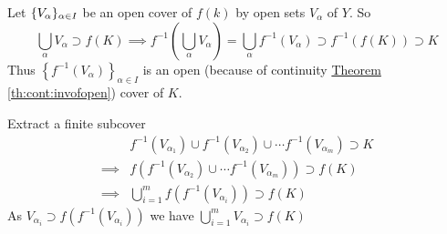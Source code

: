 \begin{myproof}
	Let $\{V_{\alpha}\}_{\alpha\in I}$ be an open cover of $f(k)$ by open sets $V_{\alpha}$ of $Y$. So $$\bigcup\limits_{\alpha}V_{\alpha} \supset f(K)\implies f^{-1}\left(\bigcup\limits_{\alpha}V_{\alpha}\right)=\bigcup\limits_{\alpha}f^{-1}\left(V_{\alpha}\right)\supset f^{-1}(f(K))\supset K$$ Thus $\left\{f^{-1}(V_{\alpha})\right\}_{\alpha\in I}$ is an open (because of continuity \hyperref[th:cont:invofopen]{Theorem \ref{th:cont:invofopen}}) cover of $K$.
	
	Extract a finite subcover \begin{align*}
		& f^{-1}\left(V_{\alpha_1}\right)\cup f^{-1}\left(V_{\alpha_2}\right) \cup \cdots f^{-1}\left(V_{\alpha_m}\right)\supset K\\ 
		\implies & f\left(f^{-1}\left(V_{\alpha_2}\right) \cup \cdots f^{-1}\left(V_{\alpha_m}\right)\right)\supset f(K)\\
		\implies& \bigcup_{i=1}^m f\left(f^{-1}\left(V_{\alpha_i}\right)\right)\supset f(K)
	\end{align*}
	As $V_{\alpha_i}\supset f\left(f^{-1}\left(V_{\alpha_i}\right)\right)$ we have $\bigcup\limits_{i=1}^mV_{\alpha_i}\supset f(K)$
\end{myproof}


